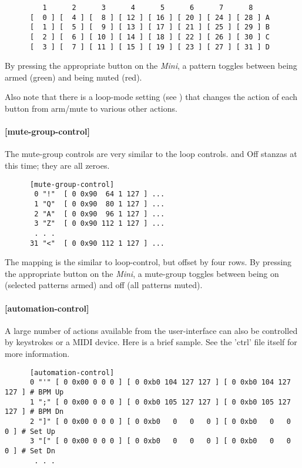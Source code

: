    \begin{verbatim}
         1      2      3      4      5      6      7      8 
      [  0 ] [  4 ] [  8 ] [ 12 ] [ 16 ] [ 20 ] [ 24 ] [ 28 ] A
      [  1 ] [  5 ] [  9 ] [ 13 ] [ 17 ] [ 21 ] [ 25 ] [ 29 ] B
      [  2 ] [  6 ] [ 10 ] [ 14 ] [ 18 ] [ 22 ] [ 26 ] [ 30 ] C
      [  3 ] [  7 ] [ 11 ] [ 15 ] [ 19 ] [ 23 ] [ 27 ] [ 31 ] D
   \end{verbatim}

   By pressing the appropriate button on the \textsl{Mini},
   a pattern toggles between
   being armed (green) and being muted (red).

   Also note that there is a loop-mode setting
   (see )
   that changes the action of each button from arm/mute to 
   various other actions.

\paragraph{[mute-group-control]}
\label{paragraph:patterns_mute_group_control}

   The mute-group controls are very similar to the loop controls.
   and Off stanzas at this time; they are all zeroes.

   \begin{verbatim}
      [mute-group-control]
       0 "!"  [ 0 0x90  64 1 127 ] ...
       1 "Q"  [ 0 0x90  80 1 127 ] ...
       2 "A"  [ 0 0x90  96 1 127 ] ...
       3 "Z"  [ 0 0x90 112 1 127 ] ...
       . . .
      31 "<"  [ 0 0x90 112 1 127 ] ...
   \end{verbatim}

   The mapping is the similar to loop-control, but offset by four rows.
   By pressing the appropriate button on the \textsl{Mini},
   a mute-group toggles between
   being on (selected patterns armed) and off (all patterns muted).

\paragraph{[automation-control]}
\label{paragraph:patterns_automation_control}

   A large number of actions available from the user-interface can also be
   controlled by keystrokes or a MIDI device.  Here is a brief sample.  See the
   'ctrl' file itself for more information.

   \begin{verbatim}
      [automation-control]
      0 "'" [ 0 0x00 0 0 0 ] [ 0 0xb0 104 127 127 ] [ 0 0xb0 104 127 127 ] # BPM Up
      1 ";" [ 0 0x00 0 0 0 ] [ 0 0xb0 105 127 127 ] [ 0 0xb0 105 127 127 ] # BPM Dn
      2 "]" [ 0 0x00 0 0 0 ] [ 0 0xb0   0   0   0 ] [ 0 0xb0   0   0   0 ] # Set Up
      3 "[" [ 0 0x00 0 0 0 ] [ 0 0xb0   0   0   0 ] [ 0 0xb0   0   0   0 ] # Set Dn
       . . .
   \end{verbatim}

